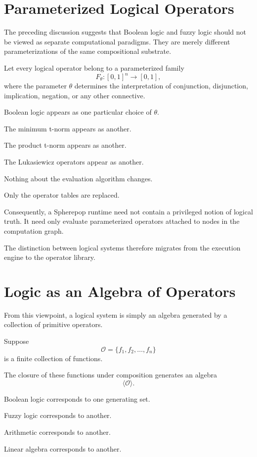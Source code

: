 \documentclass[12pt,oneside]{article}
\begin{document}
\section{Parameterized Logical Operators}

The preceding discussion suggests that Boolean logic and fuzzy logic should not be viewed as separate computational paradigms. They are merely different parameterizations of the same compositional substrate.

Let every logical operator belong to a parameterized family
\[
F_\theta : [0,1]^n \rightarrow [0,1],
\]
where the parameter $\theta$ determines the interpretation of conjunction, disjunction, implication, negation, or any other connective.

Boolean logic appears as one particular choice of $\theta$.

The minimum t-norm appears as another.

The product t-norm appears as another.

The Lukasiewicz operators appear as another.

Nothing about the evaluation algorithm changes.

Only the operator tables are replaced.

Consequently, a Spherepop runtime need not contain a privileged notion of logical truth. It need only evaluate parameterized operators attached to nodes in the computation graph.

The distinction between logical systems therefore migrates from the execution engine to the operator library.

\section{Logic as an Algebra of Operators}

From this viewpoint, a logical system is simply an algebra generated by a collection of primitive operators.

Suppose
\[
\mathcal{O}
=
\{f_1,f_2,\ldots,f_n\}
\]
is a finite collection of functions.

The closure of these functions under composition generates an algebra
\[
\langle\mathcal{O}\rangle.
\]

Boolean logic corresponds to one generating set.

Fuzzy logic corresponds to another.

Arithmetic corresponds to another.

Linear algebra corresponds to another.
\end{document}
